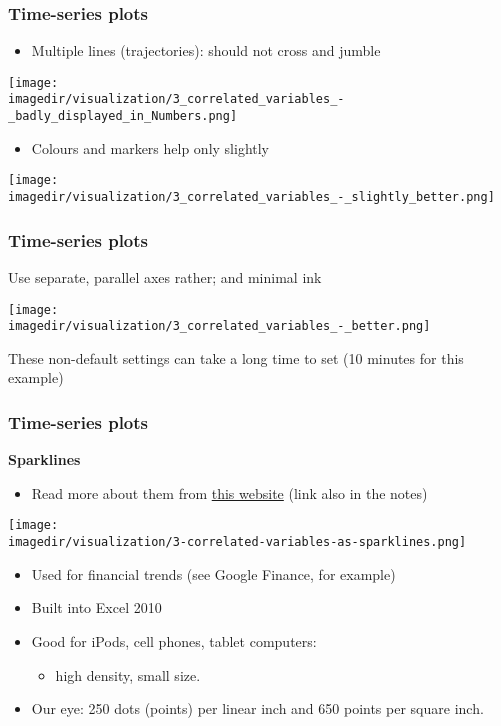 \begin{frame}\frametitle{Time-series plots}
	\begin{itemize}
		\item	Multiple lines (trajectories): should not cross and jumble 
	\end{itemize}
	\begin{center}
		\texttt{[image: \\imagedir/visualization/3\_correlated\_variables\_-\_badly\_displayed\_in\_Numbers.png]}
	\end{center}
	\begin{itemize}
		\item	Colours and markers help only slightly 
	\end{itemize}
	\begin{center}
		\texttt{[image: \\imagedir/visualization/3\_correlated\_variables\_-\_slightly\_better.png]}
	\end{center}
\end{frame}

\begin{frame}\frametitle{Time-series plots}
	Use separate, parallel axes rather; and minimal ink 
	\begin{center}
		\texttt{[image: \\imagedir/visualization/3\_correlated\_variables\_-\_better.png]}
	\end{center}
	These non-default settings can take a long time to set (10 minutes for this example)
\end{frame}

\begin{frame}\frametitle{Time-series plots}
	\textbf{Sparklines}
	\begin{itemize}
		\item	Read more about them from \href{http://www.edwardtufte.com/bboard/q-and-a-fetch-msg?msg_id=0001OR}{this website} (link also in the notes) 
	\end{itemize}
	\begin{center}
		\texttt{[image: \\imagedir/visualization/3-correlated-variables-as-sparklines.png]}
	\end{center}
	\begin{itemize}
		\item	Used for financial trends (see Google Finance, for example) 
		\item	Built into Excel 2010 
		\item	Good for iPods, cell phones, tablet computers: 
		\begin{itemize}
			\item	high density, small size. 
		\end{itemize}
		\item	Our eye: 250 dots (points) per linear inch and 650 points per square inch.
	\end{itemize}
\end{frame}

